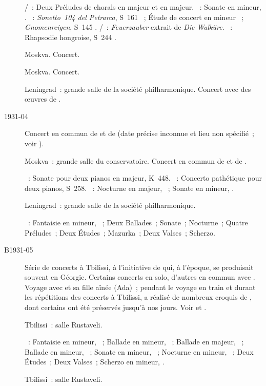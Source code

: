 \begin{description}
 \textsc{\JBach{}/\Busoni{}}~: Deux Préludes de chorals en \kC majeur et en
 \kG majeur.
 \textsc{\Beethoven{}}~: Sonate en \kC mineur, .
 \textsc{\Liszt{}}~: \emph{Sonetto~104 del Petrarca}, S~161 ~;
 Étude de concert en \kF mineur ~; \emph{Gnomenreigen}, S~145
 .
 \textsc{\Wagner{}/\Brassin{}}~: \emph{Feuerzauber} extrait de \emph{Die
 Walküre}.
 \textsc{\Liszt{}}~: Rhapsodie hongroise, S~244 .
 \item[\DateWithWeekDay{1931-04-14}]
 Moskva.
 Concert.
 \item[\DateWithWeekDay{1931-04-18}]
 Moskva.
 Concert.
 \item[\DateWithWeekDay{1931-04-21}]
 Leningrad~: grande salle de la société philharmonique.
 Concert avec des œuvres de \Chopin{}.
 \item[1931-04]
 Concert en commun de \VSofronitsky{} et de \MYudina{} (date précise
 inconnue et lieu non spécifié~; voir \citet[p.~403]{Scriabine}).
 \item[\DateWithWeekDay{1931-05-02}]
 Moskva~: grande salle du conservatoire.
 Concert en commun de \VSofronitsky{} et de \HNeuhaus{}.

 \textsc{\Mozart{}}~: Sonate pour deux pianos en \kD majeur, K~448.
 \textsc{\Liszt{}}~: Concerto pathétique pour deux pianos, S~258.
 \textsc{\Chopin{}}~: Nocturne en \kD \Flat majeur,  ~;
 Sonate en \kB \Flat mineur, .
 \item[\DateWithWeekDay{1931-05-03}]
 Leningrad~: grande salle de la société philharmonique.

 \textsc{\Chopin{}}~: Fantaisie en \kF mineur, ~; Deux Ballades~;
 Sonate~; Nocturne~; Quatre Préludes~; Deux Études~; Mazurka~; Deux Valses~;
 Scherzo.
 \item[B1931-05]
 Série de concerts à Tbilissi, à l'initiative de \MYudina{} qui, à l'époque,
 se produisait souvent en Géorgie.
 Certains concerts en solo, d'autres en commun avec \MYudina{}.
 Voyage avec \EVizel{} et sa fille aînée \AVizel{} (Ada)~; pendant le voyage
 en train et durant les répétitions des concerts à Tbilissi, \EVizel{} a
 réalisé de nombreux croquis  de \VSofronitsky{}, dont
 certains ont été préservés jusqu'à nos jours.
 Voir \citet[p.~152 et~153]{Nekrasova08} et \citet[p.~427]{Milshteyn82a}.
 \item[\DateWithWeekDay{1931-05-14}]
 Tbilissi~: salle Rustaveli.

 \textsc{\Chopin{}}~: Fantaisie en \kF mineur, ~; Ballade en \kF
 mineur, ~; Ballade en \kA \Flat majeur, ~; Ballade en \kG
 mineur, ~; Sonate en \kB \Flat mineur, ~; Nocturne en \kF
 mineur,  ~; Deux Études~; Deux Valses~; Scherzo en \kB
 mineur, .
 \item[\DateWithWeekDay{1931-05-16}]
 Tbilissi~: salle Rustaveli.


\end{description}
